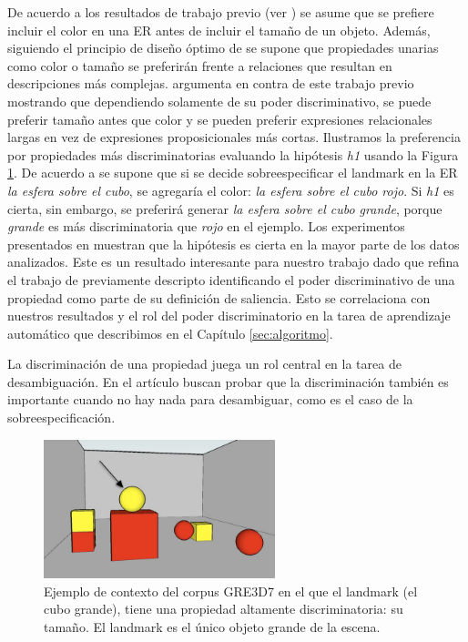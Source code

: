 De acuerdo a los resultados de trabajo previo (ver \cite{Pechmann1989}) se asume que se prefiere incluir el color en una ER antes de incluir el tama\~no de un objeto. 
Adem\'as, siguiendo el principio de dise\~no \'optimo de \cite{clark1992arenas} se supone que propiedades unarias como color o tama\~no se preferir\'an frente a relaciones que resultan en descripciones m\'as complejas. \cite{acl-Paraboni15} argumenta en contra de este trabajo previo mostrando que dependiendo solamente de su poder discriminativo, se puede preferir tama\~no antes que color y se pueden preferir expresiones relacionales largas en vez de expresiones proposicionales m\'as cortas.
Ilustramos la preferencia por propiedades m\'as discriminatorias evaluando la hip\'otesis \textit{h1} usando la Figura \ref{fig-2-2}. De acuerdo a \cite{Pechmann1989} se supone que si se decide sobreespecificar el landmark en la ER \emph{la esfera sobre el cubo}, se agregar\'ia el color: \emph{la esfera sobre el cubo rojo}. Si \textit{h1} es cierta, sin embargo, se preferir\'a generar \emph{la esfera sobre el cubo grande}, porque \emph{grande} es m\'as discriminatoria que \emph{rojo} en el ejemplo. Los experimentos presentados en \cite{acl-Paraboni15} muestran que la hip\'otesis es cierta en la mayor parte de los datos analizados. Este es un resultado interesante para nuestro trabajo dado que refina el trabajo de \cite{keysar:Curr98} previamente descripto identificando el poder discriminativo de una propiedad como parte de su definici\'on de saliencia.
Esto se correlaciona con nuestros resultados y el rol del poder discriminatorio en la tarea de aprendizaje autom\'atico que describimos en el Cap\'itulo \ref{sec:algoritmo}.

La discriminaci\'on de una propiedad juega un rol central en la tarea de desambiguaci\'on. En el art\'iculo buscan probar que la discriminaci\'on tambi\'en es importante cuando no hay nada para desambiguar, como es el caso de la sobreespecificaci\'on.




\begin{figure}[ht]
\begin{center}
\includegraphics[width=0.6\textwidth]{images/7.jpg}
\end{center}
\caption{Ejemplo de contexto del corpus GRE3D7 en el que el landmark (el cubo grande), tiene una propiedad altamente discriminatoria: su tama\~no. El landmark es el \'unico objeto grande de la escena.}
\label{fig-2-2}
\end{figure}


